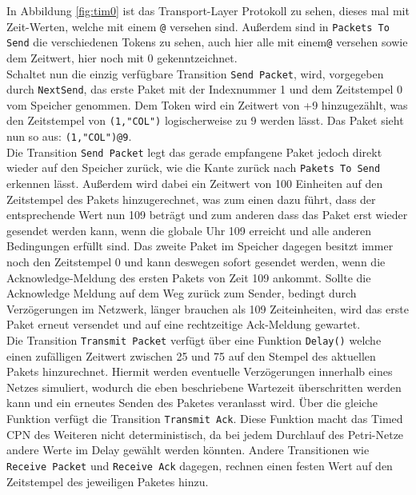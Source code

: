 \documentclass[11pt,onecolumn,a4paper,DIV=calc]{scrartcl}
\begin{document}
In Abbildung \ref{fig:tim0} ist das Transport-Layer Protokoll zu sehen, dieses mal mit Zeit-Werten, welche mit einem \texttt{@} versehen sind. Außerdem sind in \texttt{Packets To Send} die verschiedenen Tokens zu sehen, auch hier alle mit einem\texttt{@} versehen sowie dem Zeitwert, hier noch mit 0 gekenntzeichnet.\\
Schaltet nun die einzig verfügbare Transition \texttt{Send Packet}, wird, vorgegeben durch \texttt{NextSend}, das erste Paket mit der Indexnummer 1 und dem Zeitstempel 0 vom Speicher genommen. Dem Token wird ein Zeitwert von +9 hinzugezählt, was den Zeitstempel von \texttt{(1,"COL")} logischerweise zu 9 werden lässt. Das Paket sieht nun so aus: \texttt{(1,"COL")@9}. \\
Die Transition \texttt{Send Packet} legt das gerade empfangene Paket jedoch direkt wieder auf den Speicher zurück, wie die Kante zurück nach \texttt{Pakets To Send} erkennen lässt. Außerdem wird dabei ein Zeitwert von 100 Einheiten auf den Zeitstempel des Pakets hinzugerechnet, was zum einen dazu führt, dass der entsprechende Wert nun 109 beträgt und zum anderen dass das Paket erst wieder gesendet werden kann, wenn die globale Uhr 109 erreicht und alle anderen Bedingungen erfüllt sind. 
Das zweite Paket im Speicher dagegen besitzt immer noch den Zeitstempel 0 und kann deswegen sofort gesendet werden, wenn die Acknowledge-Meldung des ersten Pakets von Zeit 109 ankommt. Sollte die Acknowledge Meldung auf dem Weg zurück zum Sender, bedingt durch Verzögerungen im Netzwerk, länger brauchen als 109 Zeiteinheiten, wird das erste Paket erneut versendet und auf eine rechtzeitige Ack-Meldung gewartet.\\
\newline
Die Transition \texttt{Transmit Packet} verfügt über eine Funktion \texttt{Delay()} welche einen zufälligen Zeitwert zwischen 25 und 75 auf den Stempel des aktuellen Pakets hinzurechnet. Hiermit werden eventuelle Verzögerungen innerhalb eines Netzes simuliert, wodurch die eben beschriebene Wartezeit überschritten werden kann und ein erneutes Senden des Paketes veranlasst wird. Über die gleiche Funktion verfügt die Transition \texttt{Transmit Ack}. Diese Funktion macht das Timed CPN des Weiteren nicht deterministisch, da bei jedem Durchlauf des Petri-Netze andere Werte im Delay gewählt werden könnten. Andere Transitionen wie \texttt{Receive Packet} und \texttt{Receive Ack} dagegen, rechnen einen festen Wert auf den Zeitstempel des jeweiligen Paketes hinzu.
\end{document}
